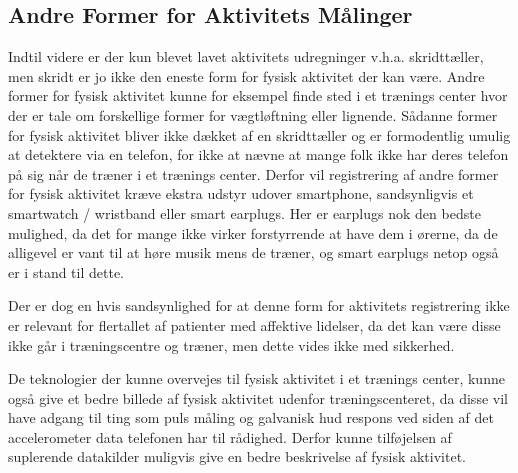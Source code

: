 \subsection{Andre Former for Aktivitets Målinger}
Indtil videre er der kun blevet lavet aktivitets udregninger v.h.a. skridttæller, men skridt er jo ikke den eneste form for fysisk aktivitet der kan være.
Andre former for fysisk aktivitet kunne for eksempel finde sted i et trænings center hvor der er tale om forskellige former for vægtløftning eller lignende.
Sådanne former for fysisk aktivitet bliver ikke dækket af en skridttæller og er formodentlig umulig at detektere via en telefon, for ikke at nævne at mange folk ikke har deres telefon på sig når de træner i et trænings center.
Derfor vil registrering af andre former for fysisk aktivitet kræve ekstra udstyr udover smartphone, sandsynligvis et smartwatch / wristband eller smart earplugs.
Her er earplugs nok den bedste mulighed, da det for mange ikke virker forstyrrende at have dem i ørerne, da de alligevel er vant til at høre musik mens de træner, og smart earplugs netop også er i stand til dette.

Der er dog en hvis sandsynlighed for at denne form for aktivitets registrering ikke er relevant for flertallet af patienter med affektive lidelser, da det kan være disse ikke går i træningscentre og træner, men dette vides ikke med sikkerhed.

De teknologier der kunne overvejes til fysisk aktivitet i et trænings center, kunne også give et bedre billede af fysisk aktivitet udenfor træningscenteret, da disse vil have adgang til ting som puls måling og galvanisk hud respons ved siden af det accelerometer data telefonen har til rådighed.
Derfor kunne tilføjelsen af suplerende datakilder muligvis give en bedre beskrivelse af fysisk aktivitet.